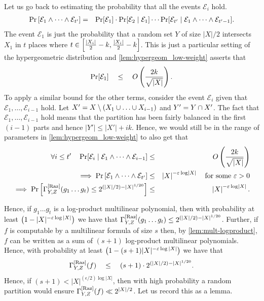 Let us go back to estimating the probability that all the events $\mathcal{E}_i$ hold.
\begin{eqnarray*}
  \Pr\left[\mathcal{E}_1 \wedge \dots \wedge \mathcal{E}_{t'}\right] & = & \Pr[\mathcal{E}_1] \cdot \Pr[\mathcal{E}_2 \mid \mathcal{E}_1] \cdots \Pr[\mathcal{E}_{t'}\mid \mathcal{E}_1 \wedge \dots \wedge \mathcal{E}_{t'-1}].
\end{eqnarray*}
The event $\mathcal{E}_1$ is just the probability that a random set $Y$ of size $|X|/2$ intersects $X_1$ in $t$ places where $t \in \left[\frac{|X_i|}{2} -k , \frac{|X_i|}{2} -k\right]$. 
This is just a particular setting of the hypergeometric distribution and \autoref{lem:hypergeom_low-weight} asserts that
$$
\Pr[\mathcal{E}_1] \quad \leq \quad O\left(\frac{2k}{\sqrt{|X|}}\right).
$$
To apply a similar bound for the other terms, consider the event $\mathcal{E}_i$ given that $\mathcal{E}_1, \dots, \mathcal{E}_{i-1}$ hold. 
Let $X' = X \setminus (X_1 \union \dots \union X_{i-1})$ and $Y' = Y\cap X'$. 
The fact that $\mathcal{E}_1,\dots, \mathcal{E}_{i-1}$ hold means that the partition has been fairly balanced in the first $(i-1)$ parts and hence $|Y'| \leq |X'| + ik$. 
Hence, we would still be in the range of parameters in \autoref{lem:hypergeom_low-weight} to also get that
\begin{eqnarray*}
  \forall i\leq t'\quad \Pr[\mathcal{E}_i\mid \mathcal{E}_1 \wedge \cdots \wedge \mathcal{E}_{i-1}] &\leq& O\left(\frac{2k}{\sqrt{|X|}}\right)\\
  \implies \Pr\left[\mathcal{E}_1\wedge \dots \wedge \mathcal{E}_{t'}\right] & \leq & \left|X\right|^{-\varepsilon \log \left|X\right|} \quad\text{for some $\varepsilon > 0$}  \\
  \implies \Pr\left[\Gamma^{\mathrm{[Raz]}}_{Y,Z}(g_1\dots g_t) \leq 2^{(|X|/2) - |X|^{1/20}}\right] & \leq & \left|X\right|^{-\varepsilon \log \left|X\right|}.
\end{eqnarray*}

\begin{sloppy}
	Hence, if $g_1\dots g_t$ is a log-product multilinear polynomial, 
	then with probability at least $\left(1 - |X|^{-\varepsilon \log |X|}\right)$ 
	we have that $\Gamma^{\mathrm{[Raz]}}_{Y,Z}(g_1\dots g_t) \leq 2^{(|X|/2) - |X|^{1/20}}$. 
	Further, if $f$ is computable by a multilinear formula of size $s$ then, 
	by \autoref{lem:mult-logproduct}, $f$ can be written as a sum of 
	$(s+1)$ log-product multilinear polynomials. 
Hence, with probability 
	at least $\left(1 - (s+1)|X|^{-\varepsilon \log |X|}\right)$ we have that
		$$\Gamma^{\mathrm{[Raz]}}_{Y,Z}(f) \quad \leq \quad (s+1) \cdot 2^{(|X|/2) - |X|^{1/20}}. $$
	Hence, if $(s+1) < |X|^{(\epsilon/2) \log |X|}$, then with high 
	probability a random partition would ensure 
	$\Gamma^{\mathrm{[Raz]}}_{Y,Z}(f) \ll 2^{|X|/2}$. 
Let us record this as a lemma.
\end{sloppy}

